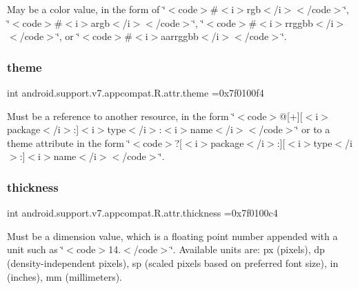May be a color value, in the form of \char`\"{}$<$code$>$\#$<$i$>$rgb$<$/i$>$$<$/code$>$\char`\"{}, \char`\"{}$<$code$>$\#$<$i$>$argb$<$/i$>$$<$/code$>$\char`\"{}, \char`\"{}$<$code$>$\#$<$i$>$rrggbb$<$/i$>$$<$/code$>$\char`\"{}, or \char`\"{}$<$code$>$\#$<$i$>$aarrggbb$<$/i$>$$<$/code$>$\char`\"{}. \mbox{\label{classandroid_1_1support_1_1v7_1_1appcompat_1_1R_1_1attr_a5f9d0e2c4bd6328154d79803aa7c78b6}} 
\subsubsection{\texorpdfstring{theme}{theme}}
{\footnotesize\ttfamily int android.\+support.\+v7.\+appcompat.\+R.\+attr.\+theme =0x7f0100f4\hspace{0.3cm}{\ttfamily [static]}}

Must be a reference to another resource, in the form \char`\"{}$<$code$>$@\mbox{[}+\mbox{]}\mbox{[}$<$i$>$package$<$/i$>$\+:\mbox{]}$<$i$>$type$<$/i$>$\+:$<$i$>$name$<$/i$>$$<$/code$>$\char`\"{} or to a theme attribute in the form \char`\"{}$<$code$>$?\mbox{[}$<$i$>$package$<$/i$>$\+:\mbox{]}\mbox{[}$<$i$>$type$<$/i$>$\+:\mbox{]}$<$i$>$name$<$/i$>$$<$/code$>$\char`\"{}. \mbox{\label{classandroid_1_1support_1_1v7_1_1appcompat_1_1R_1_1attr_ac3b33a84f49379c0a08a95d40b284a88}} 
\subsubsection{\texorpdfstring{thickness}{thickness}}
{\footnotesize\ttfamily int android.\+support.\+v7.\+appcompat.\+R.\+attr.\+thickness =0x7f0100c4\hspace{0.3cm}{\ttfamily [static]}}

Must be a dimension value, which is a floating point number appended with a unit such as \char`\"{}$<$code$>$14.\+5sp$<$/code$>$\char`\"{}. Available units are\+: px (pixels), dp (density-\/independent pixels), sp (scaled pixels based on preferred font size), in (inches), mm (millimeters). 

